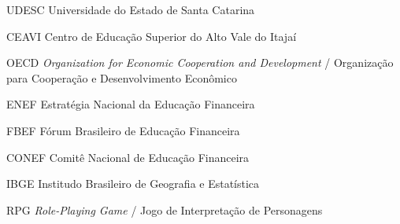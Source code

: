 
\listoffigures*
\cleardoublepage



\listoftables*
\cleardoublepage

\begin{siglas}
	\item[UDESC]  Universidade do Estado de Santa Catarina
	\item[CEAVI]  Centro de Educação Superior do Alto Vale do Itajaí

	\item[OECD]   \textit{Organization for Economic Cooperation and Development} / Organização para Cooperação e Desenvolvimento Econômico
	\item[ENEF]   Estratégia Nacional da Educação Financeira
	\item[FBEF]   Fórum Brasileiro de Educação Financeira
	\item[CONEF]  Comitê Nacional de Educação Financeira
	\item[IBGE]   Institudo Brasileiro de Geografia e Estatística
	\item[RPG]    \textit{Role-Playing Game} / Jogo de Interpretação de Personagens

\end{siglas}
